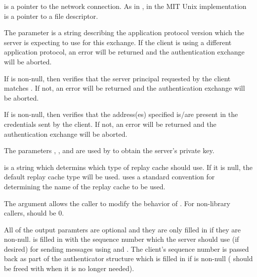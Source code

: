  is a pointer to the network connection.  As in
, in the MIT Unix implementation
 is a pointer to a file descriptor.

The parameter  is a string describing the
application protocol version which the server is expecting to use for
this exchange.  If the client is using a different application protocol,
an error will be returned and the authentication exchange will be
aborted.

If  is non-null, then 
verifies that the server principal requested by the client matches
.  If not, an error will be returned and the
authentication exchange will be aborted.

If  is non-null, then 
verifies that the address(es) specified is/are present in the
credentials sent by the client.  If not, an error will be returned and
the authentication exchange will be aborted.

The parameters , , and
 are used by  to obtain the
server's private key.

 is a string which determins which type of replay
cache  should use.  If it is null, the default
replay cache type will be used.   uses a
standard convention for determining the name of the replay cache to be
used.

The  argument allows the caller to modify the behavior of
.  For non-library callers, 
should be 0. 


All of the output paramters are optional and they are only filled in
if they are non-null.   is filled in with the
sequence number which the server should use (if desired) for sending
messages using  and
.   The client's sequence number is passed back
as part of the authenticator structure which is filled in if
 is non-null ( should be freed
with  when it is no longer needed).

